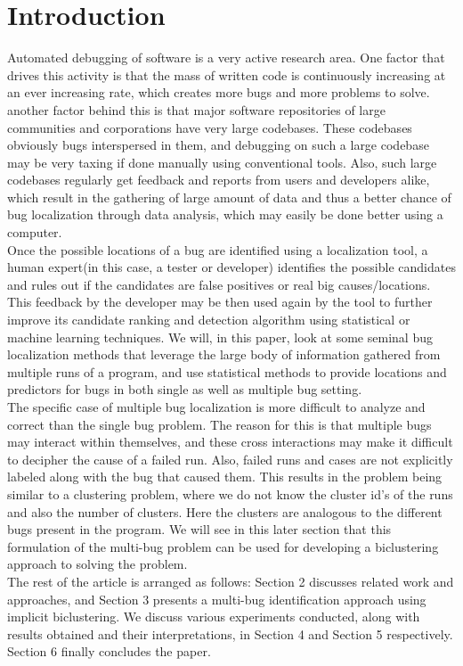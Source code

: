 \documentclass[a4paper,10pt, margin=0.75in]{article}
\begin{document}
\section{Introduction}
Automated debugging of software is a very active research area. One factor that drives this activity is that the mass of written code is continuously increasing at an ever increasing rate, which creates more bugs and more problems to solve. another factor behind this is that major software repositories of large communities and corporations have very large codebases. These codebases obviously bugs interspersed in them, and debugging on such a large codebase may be very taxing if done manually using conventional tools. Also, such large codebases regularly get feedback and reports from users and developers alike, which result in the gathering of large amount of data and thus a better chance of bug localization through data analysis, which may easily be done better using a computer.\\
Once the possible locations of a bug are identified using a localization tool, a human expert(in this case, a tester or developer) identifies the possible candidates and rules out if the candidates are false positives or real big causes/locations. This feedback by the developer may be then used again by the tool to further improve its candidate ranking and detection algorithm using statistical or machine learning techniques. We will, in this paper, look at some seminal bug localization methods that leverage the large body of information gathered from multiple runs of a program, and use statistical methods to provide locations and predictors for bugs in both single as well as multiple bug setting.\\
The specific case of multiple bug localization is more difficult to analyze and correct than the single bug problem. The reason for this is that multiple bugs may interact within themselves, and these cross interactions may make it difficult to decipher the cause of a failed run. Also, failed runs and cases are not explicitly labeled along with the bug that caused them. This results in the problem being similar to a clustering problem, where we do not know the cluster id's of the runs and also the number of clusters. Here the clusters are analogous to the different bugs present in the program. We will see in this later section that this formulation of the multi-bug problem can be used for developing a biclustering approach to solving the problem.\\
The rest of the article is arranged as follows: Section 2 discusses related work and approaches, and Section 3 presents a multi-bug identification approach using implicit biclustering. We discuss various experiments conducted, along with results obtained and their interpretations, in Section 4 and Section 5 respectively. Section 6 finally concludes the paper.
\end{document}
